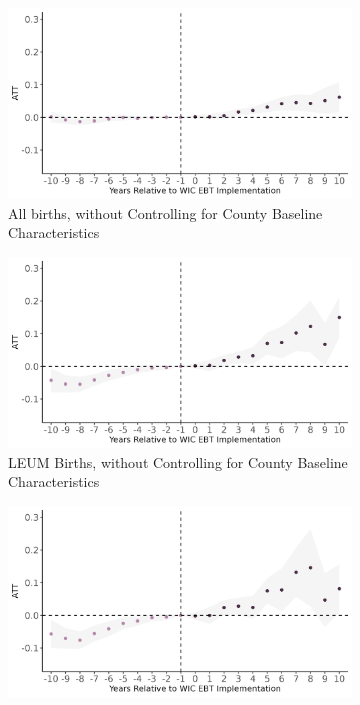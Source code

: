 \begin{figure}[!htbp]
	\begin{subfigure}[t]{.325\textwidth}
		\centering
		\includegraphics[width=\textwidth]{wic_br_dyn_all_noncov.png}  
		\caption{All births, without Controlling for County Baseline Characteristics}
		\label{cs_es1}
	\end{subfigure}
	\begin{subfigure}[t]{.325\textwidth}
		\centering
		\includegraphics[width=\textwidth]{wic_br_dyn_leum_noncov.png}  
		\caption{LEUM Births, without Controlling for County Baseline Characteristics}
		\label{cs_es2}
	\end{subfigure}
	\begin{subfigure}[t]{.325\textwidth}
		\centering
		\includegraphics[width=\textwidth]{wic_br_dyn_leum_minor_noncov.png}  

\end{subfigure}
\end{figure}
